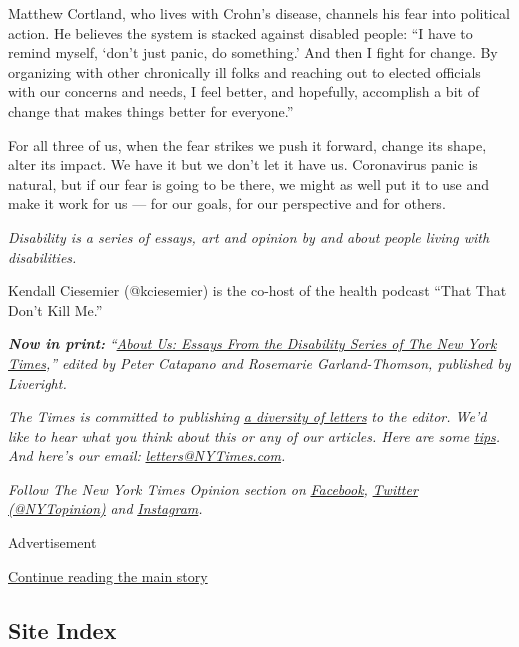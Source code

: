 Matthew Cortland, who lives with Crohn's disease, channels his fear into
political action. He believes the system is stacked against disabled
people: ``I have to remind myself, `don't just panic, do something.' And
then I fight for change. By organizing with other chronically ill folks
and reaching out to elected officials with our concerns and needs, I
feel better, and hopefully, accomplish a bit of change that makes things
better for everyone.''

For all three of us, when the fear strikes we push it forward, change
its shape, alter its impact. We have it but we don't let it have us.
Coronavirus panic is natural, but if our fear is going to be there, we
might as well put it to use and make it work for us --- for our goals,
for our perspective and for others.

\emph{Disability is a series of essays, art and opinion by and about
people living with disabilities.}

Kendall Ciesemier (@kciesemier) is the co-host of the health podcast
``That That Don't Kill Me.''

\emph{\textbf{Now in print:}}
\emph{``}\href{https://www.aboutusbook.com/}{\emph{About Us: Essays From
the Disability Series of The New York Times}}\emph{,'' edited by Peter
Catapano and Rosemarie Garland-Thomson, published by Liveright.}

\emph{The Times is committed to publishing}
\href{https://www.nytimes3xbfgragh.onion/2019/01/31/opinion/letters/letters-to-editor-new-york-times-women.html}{\emph{a
diversity of letters}} \emph{to the editor. We'd like to hear what you
think about this or any of our articles. Here are some}
\href{https://help.nytimes3xbfgragh.onion/hc/en-us/articles/115014925288-How-to-submit-a-letter-to-the-editor}{\emph{tips}}\emph{.
And here's our email:}
\href{mailto:letters@NYTimes.com}{\emph{letters@NYTimes.com}}\emph{.}

\emph{Follow The New York Times Opinion section on}
\href{https://www.facebookcorewwwi.onion/nytopinion}{\emph{Facebook}}\emph{,}
\href{http://twitter.com/NYTOpinion}{\emph{Twitter (@NYTopinion)}}
\emph{and}
\href{https://www.instagram.com/nytopinion/}{\emph{Instagram}}\emph{.}

Advertisement

\protect\hyperlink{after-bottom}{Continue reading the main story}

\hypertarget{site-index}{%
\subsection{Site Index}\label{site-index}}

